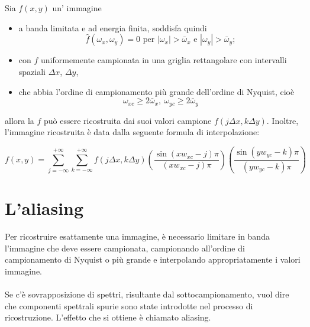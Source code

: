 \begin{theorem}
    Sia $f(x,y)$ un' immagine
    \begin{itemize}
        \item a banda limitata e ad energia finita, soddisfa quindi
              $$
                  \hat{f}(\omega_x,\omega_y) = 0 \text{ per } | \omega_x | >
                  \bar{\omega}_x \text{ e } | \omega_y | > \bar{\omega}_y;
              $$
        \item con $f$ uniformemente campionata in una
              griglia rettangolare con intervalli spaziali $\Delta x$, $\Delta y$,
        \item che abbia l'ordine di campionamento più grande dell'ordine di
              Nyquist, cioè
              $$
                  \omega_{xc} \geq 2 \bar{\omega}_x, \ \omega_{yc} \geq 2 \bar{\omega}_y
              $$
    \end{itemize}

    allora
    la $f$ può essere ricostruita dai suoi valori campione $f(j \Delta x, k
        \Delta y)$. Inoltre, l'immagine ricostruita è data dalla seguente formula di
    interpolazione:
\end{theorem}

$$
    f(x,y) = \sum_{j=-\infty}^{+\infty} \sum_{k=-\infty}^{+\infty} f(j \Delta
    x, k \Delta y) (\frac{\sin(xw_{xc}-j)\pi}{(xw_{xc}-j)\pi})
    (\frac{\sin(yw_{yc}-k)\pi}{(yw_{yc}-k)\pi})
$$

\section{L'aliasing}

Per ricostruire esattamente una immagine, è necessario limitare in banda
l'immagine che deve essere campionata, campionando all'ordine di campionamento
di Nyquist o più grande e interpolando appropriatamente i valori immagine.
\\\\Se c'è sovrapposizione di spettri, risultante dal sottocampionamento, vuol
dire che componenti spettrali spurie sono state introdotte nel processo di
ricostruzione. L'effetto che si ottiene è chiamato aliasing.

